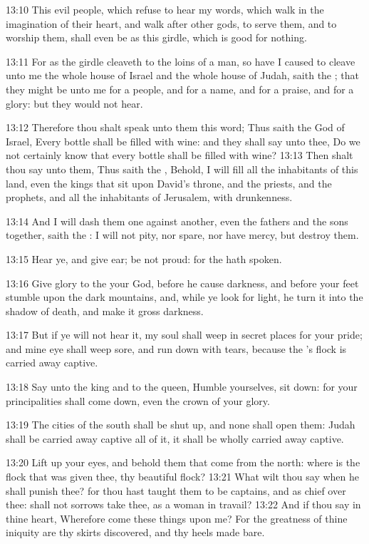 13:10 This evil people, which refuse to hear my words, which walk in the imagination of their heart, and walk after other gods, to serve them, and to worship them, shall even be as this girdle, which is good for nothing.

13:11 For as the girdle cleaveth to the loins of a man, so have I caused to cleave unto me the whole house of Israel and the whole house of Judah, saith the \LORD; that they might be unto me for a people, and for a name, and for a praise, and for a glory: but they would not hear.

13:12 Therefore thou shalt speak unto them this word; Thus saith the \LORD God of Israel, Every bottle shall be filled with wine: and they shall say unto thee, Do we not certainly know that every bottle shall be filled with wine?  13:13 Then shalt thou say unto them, Thus saith the \LORD, Behold, I will fill all the inhabitants of this land, even the kings that sit upon David's throne, and the priests, and the prophets, and all the inhabitants of Jerusalem, with drunkenness.

13:14 And I will dash them one against another, even the fathers and the sons together, saith the \LORD: I will not pity, nor spare, nor have mercy, but destroy them.

13:15 Hear ye, and give ear; be not proud: for the \LORD hath spoken.

13:16 Give glory to the \LORD your God, before he cause darkness, and before your feet stumble upon the dark mountains, and, while ye look for light, he turn it into the shadow of death, and make it gross darkness.

13:17 But if ye will not hear it, my soul shall weep in secret places for your pride; and mine eye shall weep sore, and run down with tears, because the \LORD's flock is carried away captive.

13:18 Say unto the king and to the queen, Humble yourselves, sit down: for your principalities shall come down, even the crown of your glory.

13:19 The cities of the south shall be shut up, and none shall open them: Judah shall be carried away captive all of it, it shall be wholly carried away captive.

13:20 Lift up your eyes, and behold them that come from the north: where is the flock that was given thee, thy beautiful flock?  13:21 What wilt thou say when he shall punish thee? for thou hast taught them to be captains, and as chief over thee: shall not sorrows take thee, as a woman in travail?  13:22 And if thou say in thine heart, Wherefore come these things upon me?  For the greatness of thine iniquity are thy skirts discovered, and thy heels made bare.

